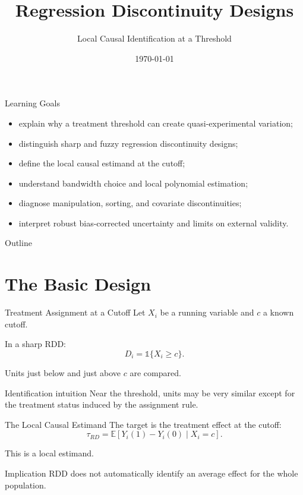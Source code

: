 \documentclass[aspectratio=169,11pt]{beamer}
\title[Regression Discontinuity]{Regression Discontinuity Designs}
\subtitle{Local Causal Identification at a Threshold}
\date{\today}
\newcommand{\E}{\mathbb{E}}
\begin{document}
\begin{frame}
\titlepage
\end{frame}

\begin{frame}{Learning Goals}
\begin{itemize}
\item explain why a treatment threshold can create quasi-experimental variation;
\item distinguish sharp and fuzzy regression discontinuity designs;
\item define the local causal estimand at the cutoff;
\item understand bandwidth choice and local polynomial estimation;
\item diagnose manipulation, sorting, and covariate discontinuities;
\item interpret robust bias-corrected uncertainty and limits on external validity.
\end{itemize}
\end{frame}

\begin{frame}{Outline}
\tableofcontents
\end{frame}

\section{The Basic Design}

\begin{frame}{Treatment Assignment at a Cutoff}
Let \(X_i\) be a running variable and \(c\) a known cutoff.

In a sharp RDD:
\[
D_i=\mathbb{1}\{X_i\ge c\}.
\]

Units just below and just above \(c\) are compared.

\begin{alertblock}{Identification intuition}
Near the threshold, units may be very similar except for the treatment status induced by the assignment rule.
\end{alertblock}
\end{frame}

\begin{frame}{The Local Causal Estimand}
The target is the treatment effect at the cutoff:
\[
\tau_{RD}
=
\E[Y_i(1)-Y_i(0)\mid X_i=c].
\]

This is a local estimand.

\begin{block}{Implication}
RDD does not automatically identify an average effect for the whole population.
\end{block}
\end{frame}
\end{document}
